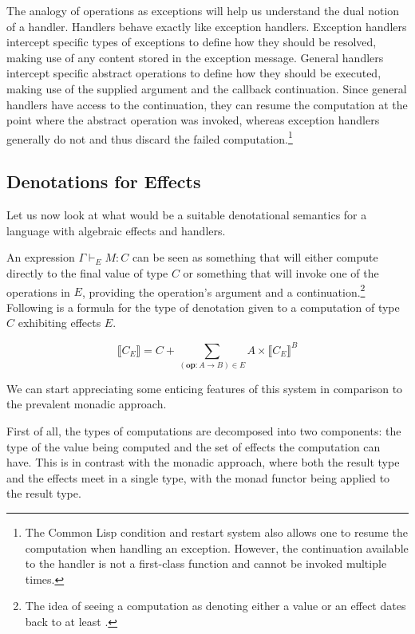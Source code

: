 \documentclass[a4paper,11pt]{easychair}
\newcommand{\sem}[1]{\llbracket #1 \rrbracket}
\newcommand{\effect}[1]{\textbf{#1}}
\begin{document}
The analogy of operations as exceptions will help us understand the dual
notion of a handler. Handlers behave exactly like exception
handlers. Exception handlers intercept specific types of exceptions to define
how they should be resolved, making use of any content stored in the exception
message. General handlers intercept specific abstract operations to define how
they should be executed, making use of the supplied argument and the callback
continuation. Since general handlers have access to the continuation, they can
resume the computation at the point where the abstract operation was invoked,
whereas exception handlers generally do not and thus discard the failed
computation.\footnote{The Common Lisp condition and restart system also allows
  one to resume the computation when handling an exception. However, the
  continuation available to the handler is not a first-class function and
  cannot be invoked multiple times.}

\subsection{Denotations for Effects}
\label{ssec:denotations-for-effects}

Let us now look at what would be a suitable denotational semantics for a
language with algebraic effects and handlers.

An expression $\Gamma \vdash_E M : C$ can be seen as something that will
either compute directly to the final value of type $C$ or something that will
invoke one of the operations in $E$, providing the operation's argument and a
continuation.\footnote{The idea of seeing a computation as denoting either a
  value or an effect dates back to at least \citet{cartwright1994extensible}.}
Following is a formula for the type of denotation given to a computation of type
$C$ exhibiting effects $E$. \citep{bauer2012programming}
\citep{kiselyov2013extensible}

$$
\sem{C_E} = C + \sum_{(\effect{op} : A \to B) \in E} A \times \sem{C_E}^B
$$

We can start appreciating some enticing features of this system in comparison
to the prevalent monadic approach.

First of all, the types of computations are decomposed into two components:
the type of the value being computed and the set of effects the computation
can have. This is in contrast with the monadic approach, where both the result
type and the effects meet in a single type, with the monad functor being
applied to the result type.
\end{document}
